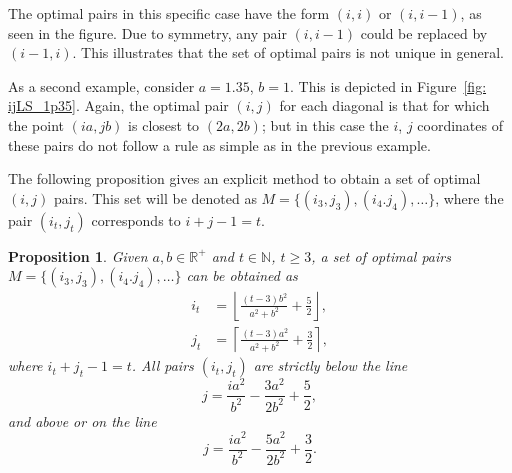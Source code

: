 \documentclass[12pt, a4paper]{article}
\newcommand{\tiles}{t} %
\newcommand{\mss}{M}
\newtheorem{proposition}{Proposition}%
\begin{document}
The optimal pairs in this specific case have the form $(i,i)$ or $(i,i-1)$, as seen in the figure. Due to symmetry, any pair $(i,i-1)$ could be replaced by $(i-1,i)$. This illustrates that the set of optimal pairs is not unique in general. 

As a second example, consider $a=1.35$, $b=1$. This is depicted in Figure~\ref{fig: ijLS_1p35}. Again, the optimal pair $(i,j)$ for each diagonal is that for which the point $(ia,jb)$ is closest to $(2a,2b)$; but in this case the $i$, $j$ coordinates of these pairs do not follow a rule as simple as in the previous example.

The following proposition gives an explicit method to obtain a set of optimal $(i,j)$ pairs. This set will be denoted as $\mss = \{(i_3,j_3), (i_4.j_4), \ldots\}$, where the pair $(i_\tiles,j_\tiles)$ corresponds to $i+j-1 = \tiles$.

\begin{proposition}
\label{prop: min suff set, form}
Given $a, b \in \mathbb R^+$ and $\tiles \in \mathbb N$, $\tiles \geq 3$, a set of optimal pairs $\mss = \{(i_3,j_3), (i_4.j_4), \ldots\}$ can be obtained as
\begin{align}
\label{eq: min suff set, form, i}
i_\tiles &= \left\lfloor \frac{(\tiles-3) b^2}{a^2+b^2} + \frac 5 2 \right\rfloor, \\
\label{eq: min suff set, form, j}
j_\tiles &= \left\lceil  \frac{(\tiles-3) a^2}{a^2+b^2} + \frac 3 2 \right\rceil,
\end{align}
where $i_\tiles + j_\tiles-1 = \tiles$. All pairs $(i_\tiles,j_\tiles)$ are strictly below the line
\begin{equation}
\label{eq: upper bound, line}
j = \frac{i a^2}{b^2} - \frac{3a^2}{2b^2} + \frac 5 2,
\end{equation}
and above or on the line
\begin{equation}
\label{eq: lower bound, line}
j = \frac{i a^2}{b^2} - \frac{5a^2}{2b^2} + \frac 3 2.
\end{equation}
\end{proposition}
\end{document}
